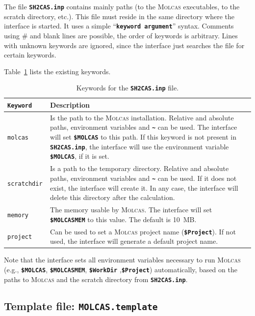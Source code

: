 \documentclass[a4paper,11pt,DIV=15,openany,twoside=false]{scrbook}
\newcommand{\ttt}[1]{\textbf{\texttt{#1}}}
\begin{document}
The file \ttt{SH2CAS.inp} contains mainly paths (to the \textsc{Molcas} executables, to the scratch directory, etc.). This file must reside in the same directory where the interface is started. It uses a simple ``\ttt{keyword argument}'' syntax. Comments using \# and blank lines are possible, the order of keywords is arbitrary. Lines with unknown keywords are ignored, since the interface just searches the file for certain keywords.

Table~\ref{tab:molcas_sh2} lists the existing keywords.

\begin{table}
  \centering
  \caption{Keywords for the \ttt{SH2CAS.inp} file.}
  \label{tab:molcas_sh2}
  \begin{tabular}{>{\tt}lp{12cm}}
  \toprule
  Keyword       &Description\\
  \midrule
molcas          &Is the path to the \textsc{Molcas} installation. Relative and absolute paths, environment variables and \ttt{\textasciitilde} can be used. The interface will set \ttt{\$MOLCAS} to this path. If this keyword is not present in \ttt{SH2CAS.inp}, the interface will use the environment variable \ttt{\$MOLCAS}, if it is set.\\
scratchdir      &Is a path to the temporary directory. Relative and absolute paths, environment variables and \ttt{\textasciitilde} can be used. If it does not exist, the interface will create it. In any case, the interface will delete this directory after the calculation.\\
memory          &The memory usable by \textsc{Molcas}. The interface will set \ttt{\$MOLCASMEM} to this value. The default is 10~MB.\\
project         &Can be used to set a \textsc{Molcas} project name (\ttt{\$Project}). If not used, the interface will generate a default project name.\\
  \bottomrule
  \end{tabular}
\end{table}

Note that the interface sets all environment variables necessary to run \textsc{Molcas} (e.g., \ttt{\$MOLCAS}, \ttt{\$MOLCASMEM}, \ttt{\$WorkDir} ,\ttt{\$Project}) automatically, based on the paths to \textsc{Molcas} and the scratch directory from \ttt{SH2CAS.inp}.

\subsection{Template file: \ttt{MOLCAS.template}}
\end{document}
